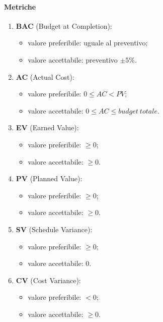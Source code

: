         \paragraph{Metriche}
            \begin{enumerate}
                \item \textbf{BAC} (Budget at Completion):
                \begin{itemize}
                    \item valore preferibile: uguale al preventivo;
                    \item valore accettabile: preventivo $\pm 5\%$.
                \end{itemize}
                \item \textbf{AC} (Actual Cost):
                \begin{itemize}
                    \item valore preferibile: $0 \leq AC < PV$;
                    \item valore accettabile: $0 \leq AC \leq budget\ totale$.
                \end{itemize}
                \item \textbf{EV} (Earned Value):
                \begin{itemize}
                    \item valore preferibile: $\geq 0$;
                    \item valore accettabile: $\geq 0$.
                \end{itemize}
                \item \textbf{PV} (Planned Value):
                \begin{itemize}
                    \item valore preferibile: $\geq 0$;
                    \item valore accettabile: $\geq 0$.
                \end{itemize}
                \item \textbf{SV} (Schedule Variance):
                \begin{itemize}
                    \item valore preferibile: $\geq 0$;
                    \item valore accettabile: $0$.
                \end{itemize}
                \item \textbf{CV} (Cost Variance):
                \begin{itemize}
                    \item valore preferibile: $< 0$;
                    \item valore accettabile: $\geq 0$.
                \end{itemize}
            \end{enumerate}
